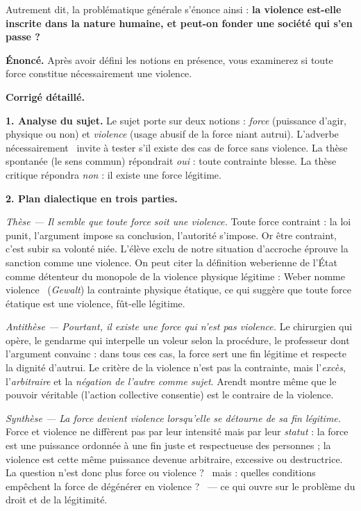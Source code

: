 \documentclass[11pt]{article}
\begin{document}
Autrement dit, la problématique générale s'énonce ainsi : \textbf{la violence est-elle inscrite dans la nature humaine, et peut-on fonder une société qui s'en passe ?}

\begin{exoresolu}
\textbf{Énoncé.} Après avoir défini les notions en présence, vous examinerez si toute force constitue nécessairement une violence.

\tcblower

\textbf{Corrigé détaillé.}

\textbf{1. Analyse du sujet.} Le sujet porte sur deux notions : \emph{force} (puissance d'agir, physique ou non) et \emph{violence} (usage abusif de la force niant autrui). L'adverbe \guillemotleft nécessairement \guillemotright\ invite à tester s'il existe des cas de force sans violence. La thèse spontanée (le sens commun) répondrait \emph{oui} : toute contrainte blesse. La thèse critique répondra \emph{non} : il existe une force légitime.

\textbf{2. Plan dialectique en trois parties.}

\emph{Thèse --- Il semble que toute force soit une violence.} Toute force contraint : la loi punit, l'argument impose sa conclusion, l'autorité s'impose. Or être contraint, c'est subir sa volonté niée. L'élève exclu de notre situation d'accroche éprouve la sanction comme une violence. On peut citer la définition weberienne de l'État comme détenteur du monopole de la \guillemotleft violence physique légitime \guillemotright : Weber nomme \guillemotleft violence \guillemotright\ (\emph{Gewalt}) la contrainte physique étatique, ce qui suggère que toute force étatique est une violence, fût-elle légitime.

\emph{Antithèse --- Pourtant, il existe une force qui n'est pas violence.} Le chirurgien qui opère, le gendarme qui interpelle un voleur selon la procédure, le professeur dont l'argument convainc : dans tous ces cas, la force sert une fin légitime et respecte la dignité d'autrui. Le critère de la violence n'est pas la contrainte, mais l'\emph{excès}, l'\emph{arbitraire} et la \emph{négation de l'autre comme sujet}. Arendt montre même que le pouvoir véritable (l'action collective consentie) est le contraire de la violence.

\emph{Synthèse --- La force devient violence lorsqu'elle se détourne de sa fin légitime.} Force et violence ne diffèrent pas par leur intensité mais par leur \emph{statut} : la force est une puissance ordonnée à une fin juste et respectueuse des personnes ; la violence est cette même puissance devenue arbitraire, excessive ou destructrice. La question n'est donc plus \guillemotleft force ou violence ? \guillemotright\ mais : \guillemotleft quelles conditions empêchent la force de dégénérer en violence ? \guillemotright\ --- ce qui ouvre sur le problème du droit et de la légitimité.


\end{exoresolu}
\end{document}

